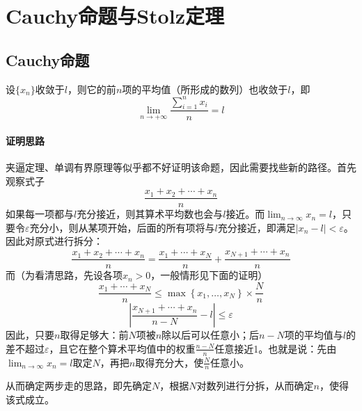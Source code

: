 \newpage
\section{Cauchy命题与Stolz定理}
\label{sec:analysis-cesaro-stolz}

\subsection{Cauchy命题}
\begin{theorem}
    设\(\{ x_{n} \}\)收敛于\(l\)，则它的前\(n\)项的平均值（所形成的数列）也收敛于\(l\)，即
\begin{equation}
    \lim_{n \to + \infty} \frac{\sum _{i = 1}^{n} x_{i}}{n} = l
\end{equation}
\end{theorem}
\paragraph{证明思路} \mbox{}

夹逼定理、单调有界原理等似乎都不好证明该命题，因此需要找些新的路径。首先观察式子
\begin{equation}
    \frac{x_{1} + x_{2} + \cdots + x_{n}}{n}
\end{equation}
如果每一项都与\(l\)充分接近，则其算术平均数也会与\(l\)接近。而\(\lim_{n \to \infty} x_{n} = l\)，只要令\(\varepsilon\)充分小，则从某项开始，后面的所有项将与\(l\)充分接近，即满足\(\left| x_{n} - l \right| < \varepsilon\)。因此对原式进行拆分：
\begin{equation}
    \frac{x_{1} + x_{2} + \cdots + x_{n}}{n} = \frac{x_{1} + \cdots + x_{N}}{n} + \frac{x_{N + 1} + \cdots + x_{n}}{n}
\end{equation}
而（为看清思路，先设各项\(x_{n} > 0\)，一般情形见下面的证明）
\begin{equation}
    \frac{x_{1} + \cdots + x_{N}}{n} \le \max \left\{ x_{1} , \ldots , x_{N} \right\} \times \frac{N}{n}
\end{equation}
\begin{equation}
    \left| \frac{x_{N + 1} + \cdots + x_{n}}{n - N} - l \right| \le \varepsilon
\end{equation}
因此，只要\(n\)取得足够大：前\(N\)项被\(n\)除以后可以任意小；后\(n - N\)项的平均值与\(l\)的差不超过\(\varepsilon\)，且它在整个算术平均值中的权重\(\frac{n - N}{n}\)任意接近1。也就是说：先由\(\lim_{n \to \infty} x_{n} = l\)取定\(N\)，再把\(n\)取得充分大，使\(\frac{N}{n}\)任意小。

从而确定两步走的思路，即先确定\(N\)，根据\(N\)对数列进行分拆，从而确定\(n\)，使得该式成立。

